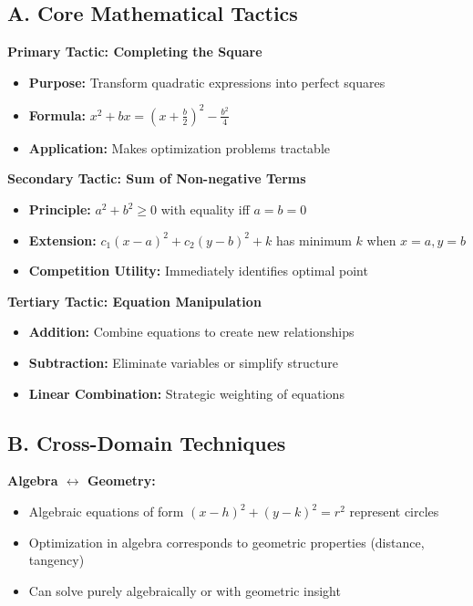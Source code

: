 \documentclass[12pt]{article}
\begin{document}
\vspace{1em}

\begin{tacticalbox}
\subsection*{A. Core Mathematical Tactics}

\textbf{Primary Tactic: Completing the Square}
\begin{itemize}
    \item \textbf{Purpose:} Transform quadratic expressions into perfect squares
    \item \textbf{Formula:} $x^2 + bx = (x + \frac{b}{2})^2 - \frac{b^2}{4}$
    \item \textbf{Application:} Makes optimization problems tractable
\end{itemize}

\textbf{Secondary Tactic: Sum of Non-negative Terms}
\begin{itemize}
    \item \textbf{Principle:} $a^2 + b^2 \geq 0$ with equality iff $a = b = 0$
    \item \textbf{Extension:} $c_1(x - a)^2 + c_2(y - b)^2 + k$ has minimum $k$ when $x = a, y = b$
    \item \textbf{Competition Utility:} Immediately identifies optimal point
\end{itemize}

\textbf{Tertiary Tactic: Equation Manipulation}
\begin{itemize}
    \item \textbf{Addition:} Combine equations to create new relationships
    \item \textbf{Subtraction:} Eliminate variables or simplify structure
    \item \textbf{Linear Combination:} Strategic weighting of equations
\end{itemize}

\subsection*{B. Cross-Domain Techniques}

\textbf{Algebra $\leftrightarrow$ Geometry:}
\begin{itemize}
    \item Algebraic equations of form $(x - h)^2 + (y - k)^2 = r^2$ represent circles
    \item Optimization in algebra corresponds to geometric properties (distance, tangency)
    \item Can solve purely algebraically or with geometric insight
\end{itemize}


\end{tacticalbox}
\end{document}
